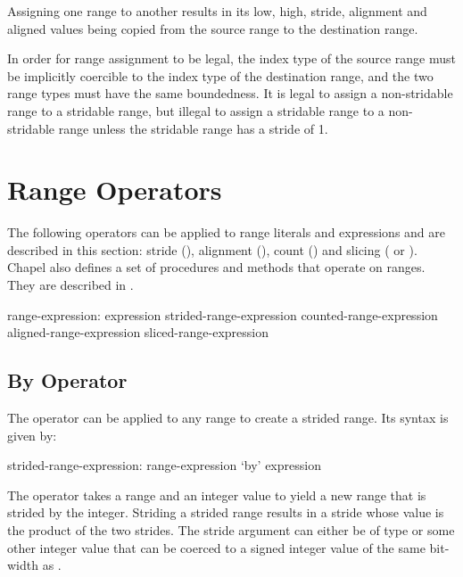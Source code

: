 Assigning one range to another results in its low, high, stride, alignment and
aligned values being copied from the source range to the destination range.

In order for range assignment to be legal, the index type of the
source range must be implicitly coercible to the index type of the
destination range, and the two range types must have the same boundedness.
It is legal to assign a non-stridable range to a stridable
range, but illegal to assign a stridable range to a non-stridable
range unless the stridable range has a stride of 1.


\section{Range Operators}
\label{Range_Operators}

The following operators can be applied to range literals and
expressions and are described in this section: stride (),
alignment (), count (\chpl{\#}) and slicing (\chpl{\(\)}
or \chpl{\[\]}).
Chapel also defines a set of procedures and methods that operate on ranges.
They are described in .

\begin{syntax}
range-expression:
  expression
  strided-range-expression
  counted-range-expression
  aligned-range-expression
  sliced-range-expression
\end{syntax}

\subsection{By Operator}
\label{By_Operator_For_Ranges}

The  operator can be applied to any range to create a strided
range.  Its syntax is given by:
\begin{syntax}
strided-range-expression:
  range-expression `by' expression
\end{syntax}

The  operator takes a range and an integer value to yield a
new range that is strided by the integer.  Striding a strided range
results in a stride whose value is the product of the two strides.
The stride argument can either be of type  or some other
integer value that can be coerced to a signed integer value of the same
bit-width as .  

